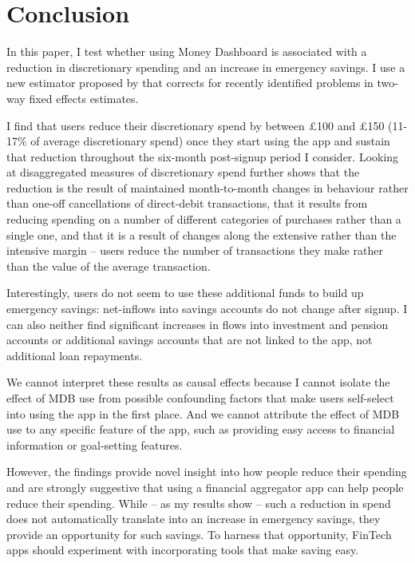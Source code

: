 
\section{Conclusion}
\label{sec:conclusion}

In this paper, I test whether using Money Dashboard is associated
with a reduction in discretionary spending and an increase in emergency
savings. I use a new estimator proposed by \citet{callaway2021difference}
that corrects for recently identified problems in two-way fixed effects
estimates.

I find that users reduce their discretionary spend by between \pounds100 and
\pounds150 (11-17\% of average discretionary spend) once they start using the
app and sustain that reduction throughout the six-month post-signup period I
consider. Looking at disaggregated measures of discretionary spend further
shows that the reduction is the result of maintained month-to-month changes in
behaviour rather than one-off cancellations of direct-debit transactions, that
it results from reducing spending on a number of different categories of
purchases rather than a single one, and that it is a result of changes along
the extensive rather than the intensive margin -- users reduce the number of
transactions they make rather than the value of the average transaction.

Interestingly, users do not seem to use these additional funds to build up
emergency savings: net-inflows into savings accounts do not change after
signup. I can also neither find significant increases in flows into investment
and pension accounts or additional savings accounts that are not linked to the
app, not additional loan repayments.

We cannot interpret these results as causal effects because I cannot isolate
the effect of MDB use from possible confounding factors that make users
self-select into using the app in the first place. And we cannot attribute the
effect of MDB use to any specific feature of the app, such as providing easy
access to financial information or goal-setting features.

However, the findings provide novel insight into how people reduce their
spending and are strongly suggestive that using a financial aggregator app can
help people reduce their spending. While -- as my results show -- such a
reduction in spend does not automatically translate into an increase in
emergency savings, they provide an opportunity for such savings. To harness
that opportunity, FinTech apps should experiment with incorporating tools that
make saving easy.

